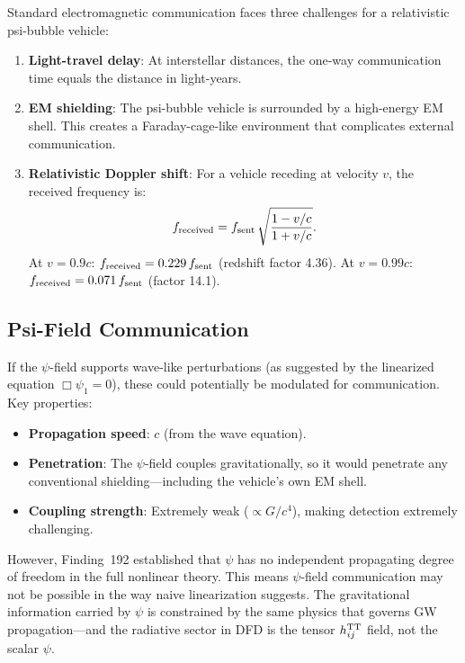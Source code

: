 \documentclass[aps,prd,twocolumn,superscriptaddress,nofootinbib]{revtex4-2}
\begin{document}
Standard electromagnetic communication faces three challenges for a
relativistic psi-bubble vehicle:
\begin{enumerate}
\item \textbf{Light-travel delay}: At interstellar distances, the
one-way communication time equals the distance in light-years.
\item \textbf{EM shielding}: The psi-bubble vehicle is surrounded
by a high-energy EM shell.  This creates a Faraday-cage-like
environment that complicates external communication.
\item \textbf{Relativistic Doppler shift}: For a vehicle receding
at velocity $v$, the received frequency is:
\begin{equation}
f_{\rm received} = f_{\rm sent}\,
\sqrt{\frac{1 - v/c}{1 + v/c}}.
\end{equation}
At $v = 0.9c$: $f_{\rm received} = 0.229\,f_{\rm sent}$ (redshift
factor 4.36).  At $v = 0.99c$: $f_{\rm received} = 0.071\,f_{\rm sent}$
(factor 14.1).
\end{enumerate}

\subsection{Psi-Field Communication}

If the $\psi$-field supports wave-like perturbations (as suggested by
the linearized equation $\Box\psi_1 = 0$), these could potentially be
modulated for communication.  Key properties:

\begin{itemize}
\item \textbf{Propagation speed}: $c$ (from the wave equation).
\item \textbf{Penetration}: The $\psi$-field couples gravitationally,
so it would penetrate any conventional shielding---including the
vehicle's own EM shell.
\item \textbf{Coupling strength}: Extremely weak ($\propto G/c^4$),
making detection extremely challenging.
\end{itemize}

However, Finding~192 established that $\psi$ has no independent
propagating degree of freedom in the full nonlinear theory.  This
means $\psi$-field communication may not be possible in the way
naive linearization suggests.  The gravitational information carried
by $\psi$ is constrained by the same physics that governs GW
propagation---and the radiative sector in DFD is the tensor
$h_{ij}^{\rm TT}$ field, not the scalar $\psi$.
\end{document}
